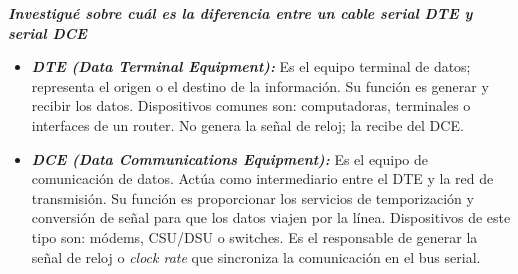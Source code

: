 \textbf{\textit{Investigué sobre cuál es la diferencia entre un cable serial DTE y serial DCE}}

\begin{itemize}
    \item \textbf{\textit{DTE (Data Terminal Equipment):}} 
        Es el equipo terminal de datos; representa el origen o el destino de la información. Su
        función es generar y recibir los datos. Dispositivos comunes son: computadoras, terminales o
        interfaces de un router. No genera la señal de reloj; la recibe del DCE. 

    \item \textbf{\textit{DCE (Data Communications Equipment):}}
        Es el equipo de comunicación de datos. Actúa como intermediario entre el DTE y la red de
        transmisión. Su función es proporcionar los servicios de temporización y conversión de señal
        para que los datos viajen por la línea. Dispositivos de este tipo son: módems, CSU/DSU o
        switches. Es el responsable de generar la señal de reloj o \textit{clock rate} que sincroniza la
        comunicación en el bus serial. 

\end{itemize}

\cite{stallings2013data}
